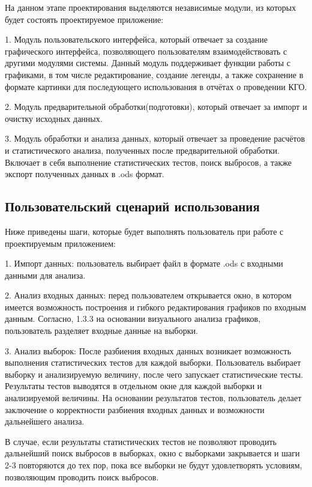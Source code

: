 На данном этапе проектирования выделяются независимые модули, из которых будет состоять проектируемое приложение:

1. Модуль пользовательского интерфейса, который отвечает за создание
графического интерфейса, позволяющего пользователям взаимодействовать с другими модулями системы. Данный модуль поддерживает функции работы с графиками, в том числе редактирование, создание легенды, а также сохранение в формате картинки для последующего использования в отчётах о проведении КГО.

2. Модуль предварительной обработки(подготовки), который
отвечает за импорт и очистку исходных данных.

3. Модуль обработки и анализа данных, который отвечает за проведение
расчётов и статистического анализа, полученных после предварительной
обработки. Включает в себя выполнение статистических тестов, поиск выбросов, а также экспорт полученных данных в .ods формат.

\subsection{Пользовательский сценарий использования} \label{Scenarii}

Ниже приведены шаги, которые будет выполнять пользователь при работе с проектируемым приложением:

1. Импорт данных: пользователь выбирает файл в формате .ods с входными данными для анализа.

2. Анализ входных данных: перед пользователем открывается окно, в котором имеется возможность построения и гибкого редактирования графиков по входным данным. Согласно, 1.3.3 на основании визуального анализа графиков, пользователь разделяет входные данные на выборки.

3. Анализ выборок: После разбиения входных данных возникает возможность выполнения статистических тестов для каждой выборки. Пользователь выбирает выборку и анализируемую величину, после чего запускает статистические тесты. Результаты тестов выводятся в отдельном окне для каждой выборки и анализируемой величины. На основании результатов тестов, пользователь делает заключение о корректности разбиения входных данных и возможности дальнейшего анализа.

В случае, если результаты статистических тестов не позволяют проводить дальнейший поиск выбросов в выборках, окно с выборками закрывается и шаги 2-3 повторяются до тех пор, пока все выборки не будут удовлетворять условиям, позволяющим проводить поиск выбросов.

